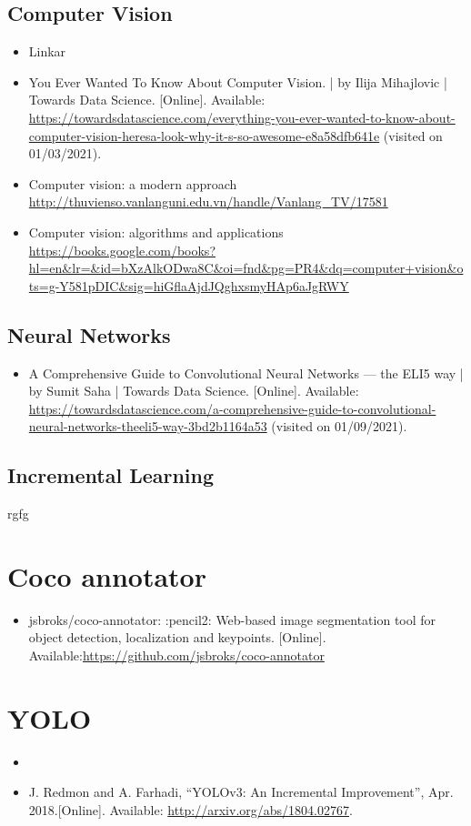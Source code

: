 \subsection{Computer Vision}
\begin{itemize}
    \item Linkar
    \item You Ever Wanted To Know About Computer Vision. | by Ilĳa Mihajlovic |
Towards Data Science. [Online]. Available: \url{https://towardsdatascience.com/everything-you-ever-wanted-to-know-about-computer-vision-heresa-look-why-it-s-so-awesome-e8a58dfb641e} (visited on 01/03/2021).
    \item Computer vision: a modern approach \url{http://thuvienso.vanlanguni.edu.vn/handle/Vanlang_TV/17581}
    \item Computer vision: algorithms and applications \url{https://books.google.com/books?hl=en&lr=&id=bXzAlkODwa8C&oi=fnd&pg=PR4&dq=computer+vision&ots=g-Y581pDIC&sig=hiGflaAjdJQghxsmyHAp6aJgRWY}
\end{itemize}

\subsection{Neural Networks}
\begin{itemize}
    \item  A Comprehensive Guide to Convolutional Neural Networks — the ELI5 way | by Sumit
Saha | Towards Data Science. [Online]. Available: \url{https://towardsdatascience.com/a-comprehensive-guide-to-convolutional-neural-networks-theeli5-way-3bd2b1164a53} (visited on 01/09/2021).
\end{itemize}
\subsection{Incremental Learning}
rgfg

\section{Coco annotator}
\begin{itemize}
    \item jsbroks/coco-annotator: :pencil2: Web-based image segmentation tool for object detection, localization and keypoints. [Online]. Available:\url{https://github.com/jsbroks/coco-annotator}
\end{itemize}

\section{YOLO}
\begin{itemize}
    \item 
    \item J. Redmon and A. Farhadi, “YOLOv3: An Incremental Improvement”, Apr. 2018.[Online]. Available: \url{http://arxiv.org/abs/1804.02767}.
\end{itemize}



